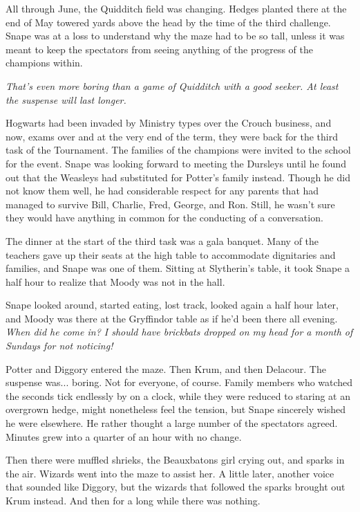 All through June, the Quidditch field was changing. Hedges planted there at the end of May towered yards above the head by the time of the third challenge. Snape was at a loss to understand why the maze had to be so tall, unless it was meant to keep the spectators from seeing anything of the progress of the champions within.

\emph{That's even more boring than a game of Quidditch with a good seeker. At least the suspense will last longer.}

Hogwarts had been invaded by Ministry types over the Crouch business, and now, exams over and at the very end of the term, they were back for the third task of the Tournament. The families of the champions were invited to the school for the event. Snape was looking forward to meeting the Dursleys until he found out that the Weasleys had substituted for Potter's family instead. Though he did not know them well, he had considerable respect for any parents that had managed to survive Bill, Charlie, Fred, George, and Ron. Still, he wasn't sure they would have anything in common for the conducting of a conversation.

The dinner at the start of the third task was a gala banquet. Many of the teachers gave up their seats at the high table to accommodate dignitaries and families, and Snape was one of them. Sitting at Slytherin's table, it took Snape a half hour to realize that Moody was not in the hall.

Snape looked around, started eating, lost track, looked again a half hour later, and Moody was there at the Gryffindor table as if he'd been there all evening. \emph{When did he come in? I should have brickbats dropped on my head for a month of Sundays for not noticing!}

\sbreak

Potter and Diggory entered the maze. Then Krum, and then Delacour. The suspense was... boring. Not for everyone, of course. Family members who watched the seconds tick endlessly by on a clock, while they were reduced to staring at an overgrown hedge, might nonetheless feel the tension, but Snape sincerely wished he were elsewhere. He rather thought a large number of the spectators agreed. Minutes grew into a quarter of an hour with no change.

Then there were muffled shrieks, the Beauxbatons girl crying out, and sparks in the air. Wizards went into the maze to assist her. A little later, another voice that sounded like Diggory, but the wizards that followed the sparks brought out Krum instead. And then for a long while there was nothing.

